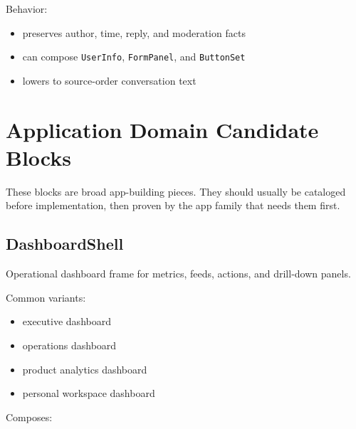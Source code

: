 Behavior:

\begin{itemize}
\tightlist
\item
  preserves author, time, reply, and moderation facts
\item
  can compose \texttt{U\allowbreak{}s\allowbreak{}e\allowbreak{}r\allowbreak{}I\allowbreak{}n\allowbreak{}f\allowbreak{}o}, \texttt{F\allowbreak{}o\allowbreak{}r\allowbreak{}m\allowbreak{}P\allowbreak{}a\allowbreak{}n\allowbreak{}e\allowbreak{}l}, and \texttt{B\allowbreak{}u\allowbreak{}t\allowbreak{}t\allowbreak{}o\allowbreak{}n\allowbreak{}S\allowbreak{}e\allowbreak{}t}
\item
  lowers to source-order conversation text
\end{itemize}

\section{Application Domain Candidate Blocks}\label{record-128-application-domain-candidate-blocks}

These blocks are broad app-building pieces. They should usually be cataloged before implementation, then proven by the app family that needs them first.

\subsection{DashboardShell}\label{record-128-dashboardshell}

Operational dashboard frame for metrics, feeds, actions, and drill-down panels.

Common variants:

\begin{itemize}
\tightlist
\item
  executive dashboard
\item
  operations dashboard
\item
  product analytics dashboard
\item
  personal workspace dashboard
\end{itemize}

Composes:

